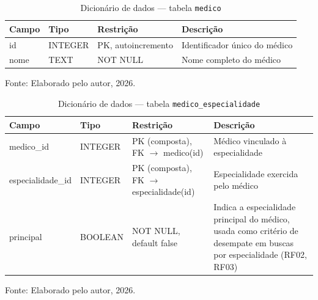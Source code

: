\documentclass[12pt,a4paper]{extarticle}
\begin{document}
\begin{table}[H]
    \centering
    \caption{Dicionário de dados --- tabela \texttt{medico}}
    {\small
    \begin{tabularx}{\textwidth}{@{}L{3.3cm} L{1.8cm} L{4.0cm} Y@{}}
        \toprule
        \textbf{Campo} & \textbf{Tipo} & \textbf{Restrição} & \textbf{Descrição} \\
        \midrule
        id & INTEGER & PK, autoincremento & Identificador único do médico \\
        nome & TEXT & NOT NULL & Nome completo do médico \\
        \bottomrule
    \end{tabularx}
    }
    \vspace{0.12cm}
    {\raggedright\footnotesize Fonte: Elaborado pelo autor, 2026.\par}
\end{table}

\begin{table}[H]
    \centering
    \caption{Dicionário de dados --- tabela \texttt{medico\_\allowbreak{}especialidade}}
    {\small
    \begin{tabularx}{\textwidth}{@{}L{3.3cm} L{1.8cm} L{4.0cm} Y@{}}
        \toprule
        \textbf{Campo} & \textbf{Tipo} & \textbf{Restrição} & \textbf{Descrição} \\
        \midrule
        medico\_\allowbreak{}id & INTEGER & PK (composta), FK $\rightarrow$ medico(id) & Médico vinculado à especialidade \\
        especialidade\_\allowbreak{}id & INTEGER & PK (composta), FK $\rightarrow$ especialidade(id) & Especialidade exercida pelo médico \\
        principal & BOOLEAN & NOT NULL, default false & Indica a especialidade principal do médico, usada como critério de desempate em buscas por especialidade (RF02, RF03) \\
        \bottomrule
    \end{tabularx}
    }
    \vspace{0.12cm}
    {\raggedright\footnotesize Fonte: Elaborado pelo autor, 2026.\par}
\end{table}
\end{document}
